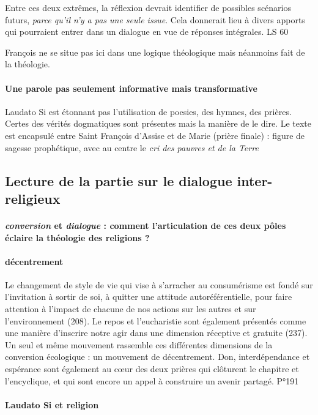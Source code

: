 \begin{singlequote}
   Entre ces deux extrêmes, la réflexion devrait identifier de possibles scénarios futurs, \textit{parce qu’il n’y a pas une seule issue}. Cela donnerait lieu à divers apports qui pourraient entrer dans un dialogue en vue de réponses intégrales. LS 60 
\end{singlequote}

François ne se situe pas ici dans une logique théologique mais néanmoins fait de la théologie.


 \paragraph{Une parole pas seulement informative mais transformative} Laudato Si est étonnant pas l'utilisation de poesies, des hymnes, des prières.  Certes des vérités dogmatiques sont présentes mais la manière de le dire.  Le texte est encapsulé entre Saint François d'Assise et de Marie (prière finale) : figure de sagesse prophétique, avec au centre le \textit{cri des pauvres et de la Terre}
 
\subsection{Lecture de la partie sur le dialogue inter-religieux}

\paragraph{\textit{conversion} et \textit{dialogue} : comment l'articulation de ces deux pôles éclaire la théologie des religions ?}
 \cite{lasida_parler_2020} \cite{campos_laudato_2017} \cite{puglisi_religious_2020}


 \paragraph{décentrement}
 \begin{singlequote}
   Le changement de style de vie qui vise à s'arracher au consumérisme est fondé sur l'invitation à sortir de soi, à quitter une attitude autoréférentielle, pour faire attention à l'impact de chacune de nos actions sur les autres et sur l'environnement (208).   Le repos et l'eucharistie sont également présentés comme une manière d'inscrire notre agir dans une dimension réceptive et gratuite (237). Un seul et même mouvement rassemble ces différentes dimensions de la conversion écologique : un mouvement de décentrement.   Don, interdépendance et espérance sont également au cœur des deux prières qui clôturent le chapitre et l'encyclique, et qui sont encore un appel à construire un avenir partagé.   \cite{francois_loue_2020}  P°191
 \end{singlequote}
 
\paragraph{Laudato Si et religion} \cite{powell_laudato_2017}    \cite{pisani_ecologie_2016}
 

       
 

 

  

 



 

  
